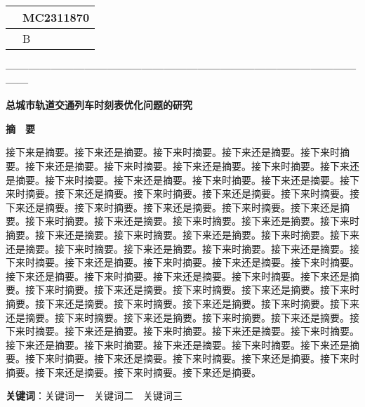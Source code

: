 \thispagestyle{empty}   %

\begin{table}[]
    \centering
    \renewcommand\arraystretch{2}
    \begin{tabular}{|l|l|}
    \hline
    \quad & MC2311870\quad \\ \hline
       & B         \\ \hline
    \end{tabular}
\end{table}



\begin{center}
    \textbf{—————————————————————————————————}

    \textbf{\fontsize{20}{1.5}总城市轨道交通列车时刻表优化问题的研究}

    \textbf{摘　要}
\end{center}





%
%

接下来是摘要。\cite{2023NianDiShiSanJieMathorCupBiSaiSaiKeGuanWang}接下来还是摘要。接下来时摘要。接下来还是摘要。接下来时摘要。接下来还是摘要。接下来时摘要。接下来还是摘要。接下来时摘要。接下来还是摘要。接下来时摘要。接下来还是摘要。接下来时摘要。接下来还是摘要。接下来时摘要。接下来还是摘要。接下来时摘要。接下来还是摘要。接下来时摘要。接下来还是摘要。接下来时摘要。接下来还是摘要。接下来时摘要。接下来还是摘要。接下来时摘要。接下来还是摘要。接下来时摘要。接下来还是摘要。接下来时摘要。接下来还是摘要。接下来时摘要。接下来还是摘要。接下来时摘要。接下来还是摘要。接下来时摘要。接下来还是摘要。接下来时摘要。接下来还是摘要。接下来时摘要。接下来还是摘要。接下来时摘要。接下来还是摘要。接下来时摘要。接下来还是摘要。接下来时摘要。接下来还是摘要。接下来时摘要。接下来还是摘要。接下来时摘要。接下来还是摘要。接下来时摘要。接下来还是摘要。接下来时摘要。接下来还是摘要。接下来时摘要。接下来还是摘要。接下来时摘要。接下来还是摘要。接下来时摘要。接下来还是摘要。接下来时摘要。接下来还是摘要。接下来时摘要。接下来还是摘要。接下来时摘要。接下来还是摘要。接下来时摘要。接下来还是摘要。接下来时摘要。接下来还是摘要。接下来时摘要。接下来还是摘要。接下来时摘要。接下来还是摘要。接下来时摘要。接下来还是摘要。接下来时摘要。接下来还是摘要。接下来时摘要。接下来还是摘要。

\textbf{关键词}：关键词一　关键词二　关键词三




%
%

\newpage
\tableofcontents
\thispagestyle{empty}